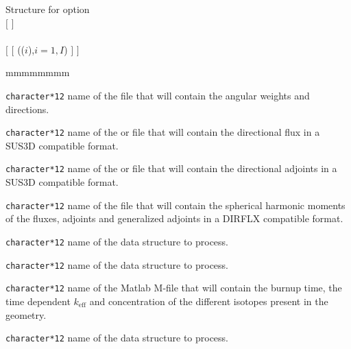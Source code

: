 \begin{enumerate}
\begin{DataStructure}{Structure  for  option}%
 \moc{:=}      \moc{::} \\ 
\hspace{1.0cm} $[$   $]$ \\
\hspace{1.0cm}  \\
\hspace{1.0cm} $[$  $[$ (($i$),$i=1,I$) $]$ $]$ 
\end{DataStructure}

\end{enumerate}

\begin{ListeDeDescription}{mmmmmmmm}

\item[\dusa{WGTANGL}] \verb|character*12| name of the  file that will
contain the angular weights and directions.

\item[\dusa{DFLUX}] \verb|character*12| name of the  or  file that will
contain the directional flux in a SUS3D compatible format.

\item[\dusa{DADJOINTS}] \verb|character*12| name of the  or  file that will contain the directional adjoints in a SUS3D compatible format.

\item[\dusa{DAF}] \verb|character*12| name of the  file that will contain the spherical harmonic moments of the fluxes, adjoints and generalized
adjoints in a DIRFLX compatible format.

\item[\dusa{FLUX}] \verb|character*12| name of the  data structure to process.

\item[\dusa{VOLTRK}] \verb|character*12| name of the  data structure to process.

\item[\dusa{MFILE}] \verb|character*12|  name of the   Matlab M-file that will
contain the burnup time, the time dependent $k_{\text{eff}}$ and concentration of the different isotopes present in the geometry.

\item[\dusa{EDITION}] \verb|character*12| name of the  data structure to process.


\end{ListeDeDescription}
